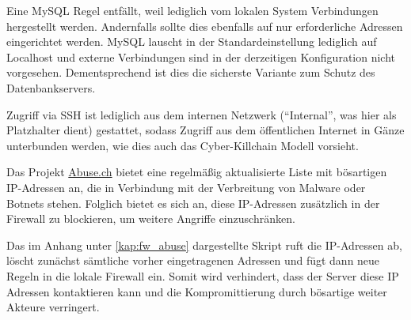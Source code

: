 Eine MySQL Regel entfällt, weil lediglich vom lokalen System Verbindungen hergestellt werden. Andernfalls sollte dies ebenfalls auf nur erforderliche Adressen eingerichtet werden. MySQL lauscht in der Standardeinstellung lediglich auf Localhost und externe Verbindungen sind in der derzeitigen Konfiguration nicht vorgesehen. Dementsprechend ist dies die sicherste Variante zum Schutz des Datenbankservers.

Zugriff via \ac{SSH} ist lediglich aus dem internen Netzwerk (\enquote{Internal}, was hier als Platzhalter dient) gestattet, sodass Zugriff aus dem öffentlichen Internet in Gänze unterbunden werden, wie dies auch das Cyber-Killchain Modell vorsieht.

Das Projekt \href{https://abuse.ch}{Abuse.ch} bietet eine regelmäßig aktualisierte Liste mit bösartigen IP-Adressen an, die in Verbindung mit der Verbreitung von Malware oder Botnets stehen. Folglich bietet es sich an, diese IP-Adressen zusätzlich in der Firewall zu blockieren, um weitere Angriffe einzuschränken.

Das im Anhang unter \autoref{kap:fw_abuse} dargestellte Skript ruft die IP-Adressen ab, löscht zunächst sämtliche vorher eingetragenen Adressen und fügt dann neue Regeln in die lokale Firewall ein. Somit wird verhindert, dass der Server diese IP Adressen kontaktieren kann und die Kompromittierung durch bösartige weiter Akteure verringert.
